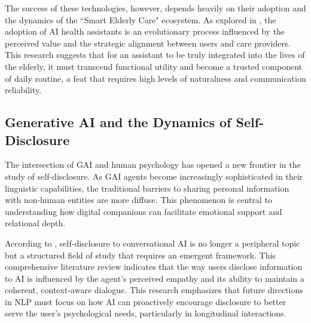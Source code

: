 The success of these technologies, however, depends heavily on their adoption and the dynamics of the ``Smart Elderly Care" ecosystem. As explored in \cite{Shang2025}, the adoption of AI health assistants is an evolutionary process influenced by the perceived value and the strategic alignment between users and care providers. This research suggests that for an assistant to be truly integrated into the lives of the elderly, it must transcend functional utility and become a trusted component of daily routine, a feat that requires high levels of naturalness and communication reliability.



    \subsection{Generative AI and the Dynamics of Self-Disclosure}

The intersection of GAI and human psychology has opened a new frontier in the study of self-disclosure. As GAI agents become increasingly sophisticated in their linguistic capabilities, the traditional barriers to sharing personal information with non-human entities are more diffuse. This phenomenon is central to understanding how digital companions can facilitate emotional support and relational depth.

According to \cite{Papneja2024}, self-disclosure to conversational AI is no longer a peripheral topic but a structured field of study that requires an emergent framework. This comprehensive literature review indicates that the way users disclose information to AI is influenced by the agent's perceived empathy and its ability to maintain a coherent, context-aware dialogue. This research emphasizes that future directions in NLP must focus on how AI can proactively encourage disclosure to better serve the user's psychological needs, particularly in longitudinal interactions.



